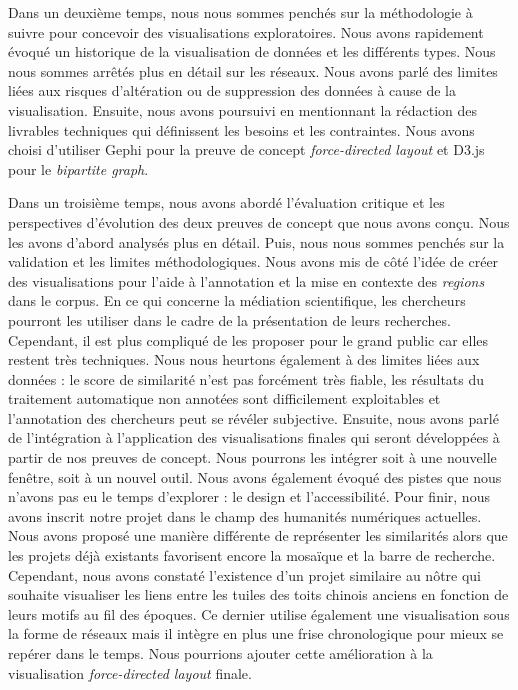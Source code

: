 \documentclass[a4paper,12pt,twoside]{book}
\begin{document}
	Dans un deuxième temps, nous nous sommes penchés sur la méthodologie à suivre pour concevoir des visualisations exploratoires. Nous avons rapidement évoqué un historique de la visualisation de données et les différents types. Nous nous sommes arrêtés plus en détail sur les réseaux. Nous avons parlé des limites liées aux risques d'altération ou de suppression des données à cause de la visualisation. Ensuite, nous avons poursuivi en mentionnant la rédaction des livrables techniques qui définissent les besoins et les contraintes. Nous avons choisi d'utiliser Gephi pour la preuve de concept \textit{force-directed layout} et D3.js pour le \textit{bipartite graph}. 
	
	Dans un troisième temps, nous avons abordé l'évaluation critique et les perspectives d'évolution des deux preuves de concept que nous avons conçu. Nous les avons d'abord analysés plus en détail. Puis, nous nous sommes penchés sur la validation et les limites méthodologiques. Nous avons mis de côté l'idée de créer des visualisations pour l'aide à l'annotation et la mise en contexte des \textit{regions} dans le corpus. En ce qui concerne la médiation scientifique, les chercheurs pourront les utiliser dans le cadre de la présentation de leurs recherches. Cependant, il est plus compliqué de les proposer pour le grand public car elles restent très techniques. Nous nous heurtons également à des limites liées aux données : le score de similarité n'est pas forcément très fiable, les résultats du traitement automatique non annotées sont difficilement exploitables et l'annotation des chercheurs peut se révéler subjective. Ensuite, nous avons parlé de l'intégration à l'application des visualisations finales qui seront développées à partir de nos preuves de concept. Nous pourrons les intégrer soit à une nouvelle fenêtre, soit à un nouvel outil. Nous avons également évoqué des pistes que nous n'avons pas eu le temps d'explorer : le design et l'accessibilité. Pour finir, nous avons inscrit notre projet dans le champ des humanités numériques actuelles. Nous avons proposé une manière différente de représenter les similarités alors que les projets déjà existants favorisent encore la mosaïque et la barre de recherche. Cependant, nous avons constaté l'existence d'un projet similaire au nôtre qui souhaite visualiser les liens entre les tuiles des toits chinois anciens en fonction de leurs motifs au fil des époques. Ce dernier utilise également une visualisation sous la forme de réseaux mais il intègre en plus une frise chronologique pour mieux se repérer dans le temps. Nous pourrions ajouter cette amélioration à la visualisation \textit{force-directed layout} finale.
	
\end{document}

